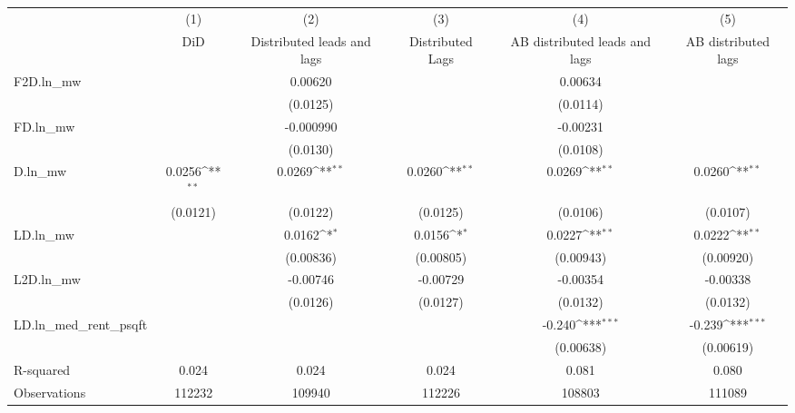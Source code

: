 {
\def\sym#1{\ifmmode^{#1}\else\(^{#1}\)\fi}
\begin{tabular}{l*{5}{c}}
\hline\hline
          &\multicolumn{1}{c}{(1)}&\multicolumn{1}{c}{(2)}&\multicolumn{1}{c}{(3)}&\multicolumn{1}{c}{(4)}&\multicolumn{1}{c}{(5)}\\
          &\multicolumn{1}{c}{DiD}&\multicolumn{1}{c}{Distributed leads and lags}&\multicolumn{1}{c}{Distributed Lags}&\multicolumn{1}{c}{AB distributed leads and lags}&\multicolumn{1}{c}{AB distributed lags}\\
\hline
F2D.ln\_mw &                  &  0.00620         &                  &  0.00634         &                  \\
          &                  & (0.0125)         &                  & (0.0114)         &                  \\
[1em]
FD.ln\_mw  &                  &-0.000990         &                  & -0.00231         &                  \\
          &                  & (0.0130)         &                  & (0.0108)         &                  \\
[1em]
D.ln\_mw   &   0.0256\sym{**} &   0.0269\sym{**} &   0.0260\sym{**} &   0.0269\sym{**} &   0.0260\sym{**} \\
          & (0.0121)         & (0.0122)         & (0.0125)         & (0.0106)         & (0.0107)         \\
[1em]
LD.ln\_mw  &                  &   0.0162\sym{*}  &   0.0156\sym{*}  &   0.0227\sym{**} &   0.0222\sym{**} \\
          &                  &(0.00836)         &(0.00805)         &(0.00943)         &(0.00920)         \\
[1em]
L2D.ln\_mw &                  & -0.00746         & -0.00729         & -0.00354         & -0.00338         \\
          &                  & (0.0126)         & (0.0127)         & (0.0132)         & (0.0132)         \\
[1em]
LD.ln\_med\_rent\_psqft&                  &                  &                  &   -0.240\sym{***}&   -0.239\sym{***}\\
          &                  &                  &                  &(0.00638)         &(0.00619)         \\
\hline
R-squared &    0.024         &    0.024         &    0.024         &    0.081         &    0.080         \\
Observations&   112232         &   109940         &   112226         &   108803         &   111089         \\
\hline\hline
\end{tabular}
}
